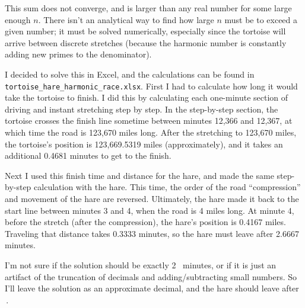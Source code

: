 \documentclass{article}
\begin{document}
This sum does not converge, and is larger than any real number for some large enough $n$.
There isn't an analytical way to find how large $n$ must be to exceed a given number; it must be solved numerically, especially since the tortoise will arrive between discrete stretches (because the harmonic number is constantly adding new primes to the denominator).

I decided to solve this in Excel, and the calculations can be found in \texttt{tortoise\_hare\_harmonic\_race.xlsx}.
First I had to calculate how long it would take the tortoise to finish.
I did this by calculating each one-minute section of driving and instant stretching step by step.
In the step-by-step section, the tortoise crosses the finish line sometime between minutes 12,366 and 12,367, at which time the road is 123,670 miles long.
After the stretching to 123,670 miles, the tortoise's position is 123,669.5319 miles (approximately), and it takes an additional 0.4681 minutes to get to the finish.

Next I used this finish time and distance for the hare, and made the same step-by-step calculation with the hare.
This time, the order of the road ``compression'' and movement of the hare are reversed.
Ultimately, the hare made it back to the start line between minutes 3 and 4, when the road is 4 miles long.
At minute 4, before the stretch (after the compression), the hare's position is 0.4167 miles.
Traveling that distance takes 0.3333 minutes, so the hare must leave after 2.6667 minutes.

I'm not sure if the solution should be exactly 2~ minutes, or if it is just an artifact of the truncation of decimals and adding/subtracting small numbers.
So I'll leave the solution as an approximate decimal, and the hare should leave after
\,.
\end{document}
